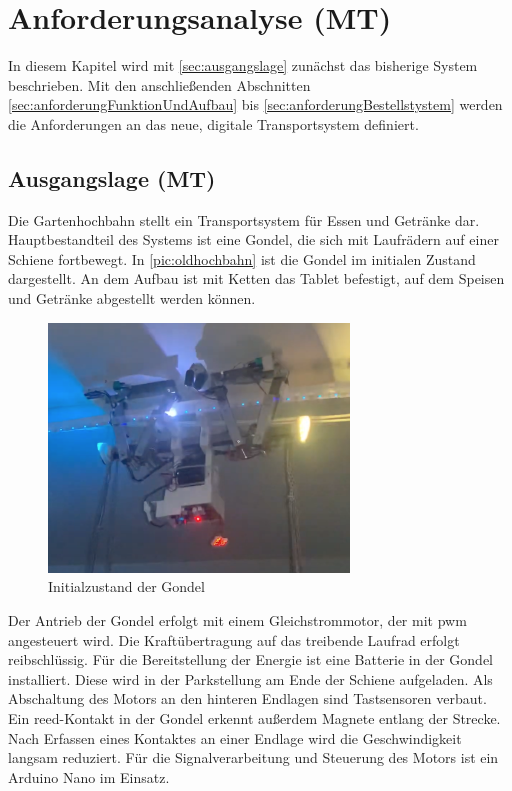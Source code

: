 \chapter{Anforderungsanalyse (MT)}
\label{cha:anforderungsanalyse}

In diesem Kapitel wird mit \autoref{sec:ausgangslage} zunächst das bisherige System beschrieben. Mit den anschließenden Abschnitten \ref{sec:anforderungFunktionUndAufbau} bis \ref{sec:anforderungBestellstystem} werden die Anforderungen an das neue, digitale Transportsystem definiert. 

\section{Ausgangslage (MT)}
\label{sec:ausgangslage}
Die Gartenhochbahn stellt ein Transportsystem für Essen und Getränke dar. Hauptbestandteil des Systems ist eine Gondel, die sich mit Laufrädern auf einer Schiene fortbewegt. In \autoref{pic:oldhochbahn} ist die Gondel im initialen Zustand dargestellt. An dem Aufbau ist mit Ketten das Tablet befestigt, auf dem Speisen und Getränke abgestellt werden können.  

\begin{figure}[h]
	\begin{center}
		\includegraphics[width=8cm]{oldHochbahn.png}
		\caption{Initialzustand der Gondel}
		\label{pic:oldhochbahn}
	\end{center}
\end{figure}
\newpage

Der Antrieb der Gondel erfolgt mit einem Gleichstrommotor, der mit \acrfull{pwm} angesteuert wird. Die Kraftübertragung auf das treibende Laufrad erfolgt reibschlüssig. Für die Bereitstellung der Energie ist eine Batterie in der Gondel installiert. Diese wird in der Parkstellung am Ende der Schiene aufgeladen. Als Abschaltung des Motors an den hinteren Endlagen sind Tastsensoren verbaut. Ein \acrshort{reed}-Kontakt in der Gondel erkennt außerdem Magnete entlang der Strecke. Nach Erfassen eines Kontaktes an einer Endlage wird die Geschwindigkeit langsam reduziert. Für die Signalverarbeitung und Steuerung des Motors ist ein Arduino Nano im Einsatz. \\

